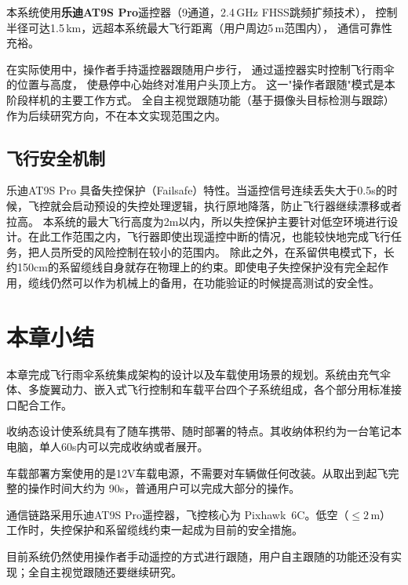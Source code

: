 本系统使用\textbf{乐迪AT9S Pro}遥控器（9通道，2.4\,GHz FHSS跳频扩频技术），
控制半径可达1.5\,km，远超本系统最大飞行距离（用户周边5\,m范围内），
通信可靠性充裕。

在实际使用中，操作者手持遥控器跟随用户步行，
通过遥控器实时控制飞行雨伞的位置与高度，
使悬停中心始终对准用户头顶上方。
这一"操作者跟随"模式是本阶段样机的主要工作方式。
全自主视觉跟随功能（基于摄像头目标检测与跟踪）
作为后续研究方向，不在本文实现范围之内。

\subsection{飞行安全机制}

乐迪AT9S Pro 具备失控保护（Failsafe）特性。当遥控信号连续丢失大于0.5s的时候，飞控就会启动预设的失控处理逻辑，执行原地降落，防止飞行器继续漂移或者拉高。
本系统的最大飞行高度为2m以内，所以失控保护主要针对低空环境进行设计。在此工作范围之内，飞行器即使出现遥控中断的情况，也能较快地完成飞行任务，把人员所受的风险控制在较小的范围内。
除此之外，在系留供电模式下，长约150cm的系留缆线自身就存在物理上的约束。即使电子失控保护没有完全起作用，缆线仍然可以作为机械上的备用，在功能验证的时候提高测试的安全性。


\section{本章小结}

本章完成飞行雨伞系统集成架构的设计以及车载使用场景的规划。系统由充气伞体、多旋翼动力、嵌入式飞行控制和车载平台四个子系统组成，各个部分用标准接口配合工作。

收纳态设计使系统具有了随车携带、随时部署的特点。其收纳体积约为一台笔记本电脑，单人60s内可以完成收纳或者展开。

车载部署方案使用的是12V车载电源，不需要对车辆做任何改装。从取出到起飞完整的操作时间大约为 90s，普通用户可以完成大部分的操作。

通信链路采用乐迪AT9S Pro遥控器，飞控核心为 Pixhawk~6C。低空（$\leq 2$\,m）工作时，失控保护和系留缆线约束一起成为目前的安全措施。

目前系统仍然使用操作者手动遥控的方式进行跟随，用户自主跟随的功能还没有实现；全自主视觉跟随还要继续研究。